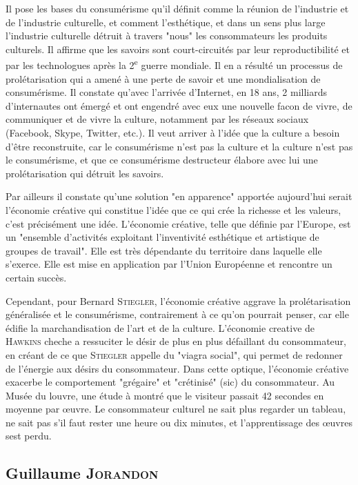 \documentclass[a4paper,10pt]{article}
\begin{document}
Il pose les bases du consumérisme qu'il définit comme la réunion de l'industrie et de l'industrie culturelle, et comment l'esthétique, et dans un sens plus large l'industrie culturelle détruit à travers "nous" les consommateurs les produits culturels. Il affirme que les savoirs sont court-circuités par leur reproductibilité et par les technologues après la 2\textsuperscript{e} guerre mondiale. Il en a résulté un processus de prolétarisation qui a amené à une perte de savoir et une mondialisation de consumérisme. Il constate qu'avec l'arrivée d'Internet, en 18 ans, 2 milliards d'internautes ont émergé et ont engendré avec eux une nouvelle facon de vivre, de communiquer et de vivre la culture, notamment par les réseaux sociaux (Facebook, Skype, Twitter, etc.). Il veut arriver à l'idée que la culture a besoin d'être reconstruite, car le consumérisme n'est pas la culture et la culture n'est pas le consumérisme, et que ce consumérisme destructeur élabore avec lui une prolétarisation qui détruit les savoirs.

Par ailleurs il constate qu'une solution "en apparence" apportée aujourd'hui serait l'économie créative qui constitue l'idée que ce qui crée la richesse et les valeurs, c'est précisément une idée. L'économie créative, telle que définie par l'Europe, est un "ensemble d'activités exploitant l'inventivité esthétique et artistique de groupes de travail". Elle est très dépendante du territoire dans laquelle elle s'exerce. Elle est mise en application par l'Union Européenne et rencontre un certain succès.

Cependant, pour Bernard \textsc{Stiegler}, l'économie créative aggrave la prolétarisation généralisée et le consumérisme, contrairement à ce qu'on pourrait penser, car elle édifie la marchandisation de l’art et de la culture. L'économie creative de \textsc{Hawkins} cheche a ressuciter le désir de plus en plus défaillant du consommateur, en créant de ce que \textsc{Stiegler} appelle du "viagra social", qui permet de redonner de l'énergie aux désirs du consommateur. Dans cette optique, l'économie créative exacerbe le comportement "grégaire" et "crétinisé" (sic) du consommateur. Au Musée du louvre, une étude à montré que le visiteur passait 42 secondes en moyenne par \oe{}uvre. Le consommateur culturel ne sait plus regarder un tableau, ne sait pas s'il faut rester une heure ou dix minutes, et l'apprentissage des \oe{}uvres sest perdu.

\subsection{Guillaume \textsc{Jorandon}}
\end{document}
